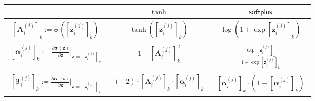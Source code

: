 \documentclass[a4paper, 12pt]{scrartcl}
\begin{document}
\begin{center}
    \begin{tabular}{c | c | c}
        & $\tanh$ & $\mathsf{softplus}$ \\
        \hline
        $\begin{aligned}
            \left[\bm{A}^{(j)}_i\right]_k := \bm{\sigma}\left(\left[\bm{z}_i^{(j)}\right]_k\right)
        \end{aligned}$
        &
        $\begin{aligned}
            \tanh\!\left(\left[\bm{z}_i^{(j)}\right]_k \right)
        \end{aligned}$
        &
        $\begin{aligned}
            \log\!\left(1 + \exp\left[\bm{z}_i^{(j)}\right]_k\right)
        \end{aligned}$ \\
        \hline
        $\begin{aligned}
            \left[\bm{\alpha}^{(j)}_i\right]_k :=\frac{\partial \bm{\sigma}(\bm{z})}{\partial \bm{z}} \bigg|_{\bm{z} = \left[\bm{z}_i^{(j)}\right]_k}
        \end{aligned}$
        &
        $\begin{aligned}
            1 - \left[\bm{A}^{(j)}_i\right]_k^2
        \end{aligned}$
        &
        $\begin{aligned}
            \frac{\exp\left[\bm{z}_i^{(j)}\right]_k}{1 + \exp\left[\bm{z}_i^{(j)}\right]_k}
        \end{aligned}$ 
        \\
        \hline
        $\begin{aligned}
            \left[\bm{\beta}^{(j)}_i\right]_k :=\frac{\partial \bm{\alpha}(\bm{z})}{\partial \bm{z}} \bigg|_{\bm{z} = \left[\bm{z}_i^{(j)}\right]_k}
        \end{aligned}$
        &
        $\begin{aligned}
            (-2) \cdot \left[\bm{A}^{(j)}_i\right]_k \cdot  \left[\bm{\alpha}^{(j)}_i\right]_k
        \end{aligned}$
        &
        $\begin{aligned}
            \left[\bm{\alpha}^{(j)}_i\right]_k \cdot \left(1 - \left[\bm{\alpha}^{(j)}_i\right]_k \right)
        \end{aligned}$ 
        \\

\end{tabular}
\end{center}
\end{document}
